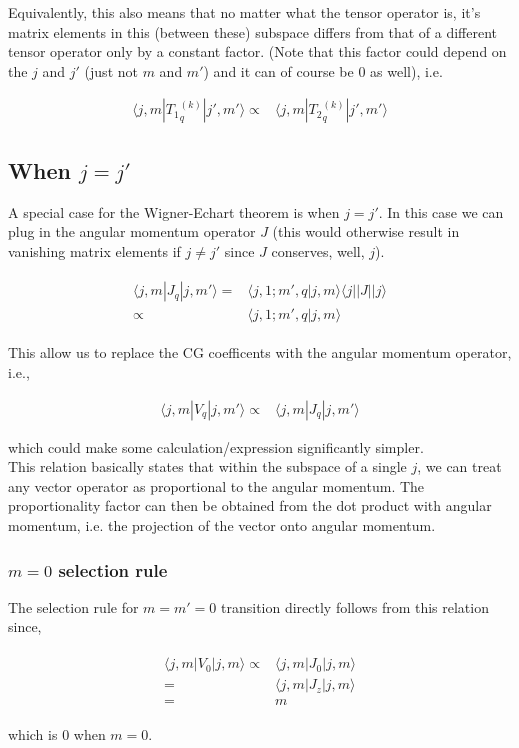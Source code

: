 \documentclass[10pt,fleqn]{article}
\newcommand{\eqar}[1]
{
  \begin{align}
    #1
  \end{align}
}
\begin{document}
Equivalently, this also means that no matter what the tensor operator is,
it's matrix elements in this (between these) subspace
differs from that of a different tensor operator only by a constant factor.
(Note that this factor could depend on the $j$ and $j'$ (just not $m$ and $m'$)
and it can of course be $0$ as well), i.e.
\eqar{
  \langle j,m|{T_1}_q^{(k)}|j',m'\rangle\propto&\langle j,m|{T_2}_q^{(k)}|j',m'\rangle
}

\subsection{When $j=j'$}
A special case for the Wigner-Echart theorem is when $j=j'$.
In this case we can plug in the angular momentum operator $J$
(this would otherwise result in vanishing matrix elements if $j\neq j'$
since $J$ conserves, well, $j$).
\eqar{
  \begin{split}
    \langle j,m|J_q|j,m' \rangle=&\langle j,1;m',q|j,m\rangle\langle j||J||j\rangle\\
    \propto&\langle j,1;m',q|j,m\rangle
  \end{split}
}
This allow us to replace the CG coefficents with the angular momentum operator, i.e.,
\eqar{
  \label{eq:jj:prop1}
  \langle j,m|V_q|j,m'\rangle\propto&\langle j,m|J_q|j,m'\rangle
}
which could make some calculation/expression significantly simpler.\\

This relation basically states that within the subspace of a single $j$,
we can treat any vector operator as proportional to the angular momentum.
The proportionality factor can then be obtained from the dot product
with angular momentum, i.e. the projection of the vector onto angular momentum.

\subsubsection{$m=0$ selection rule}
The selection rule for $m=m'=0$ transition directly follows from this relation
since,
\eqar{
  \begin{split}
    \langle j,m|V_0|j,m\rangle\propto&\langle j,m|J_0|j,m\rangle\\
    =&\langle j,m|J_z|j,m\rangle\\
    =&m
  \end{split}
}
which is $0$ when $m=0$.
\end{document}
